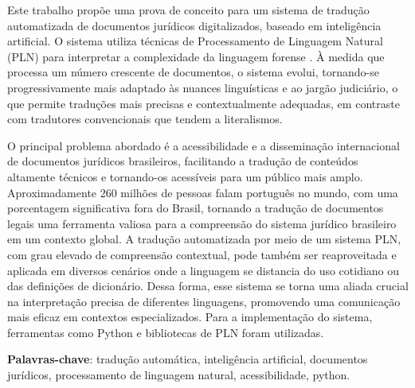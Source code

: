 
\setlength{\absparsep}{18pt} %
\begin{resumo}


Este trabalho propõe uma prova de conceito para um sistema de tradução automatizada de documentos jurídicos digitalizados, baseado em inteligência artificial. O sistema utiliza técnicas de Processamento de Linguagem Natural (PLN) para interpretar a complexidade da linguagem forense . À medida que processa um número crescente de documentos, o sistema evolui, tornando-se progressivamente mais adaptado às nuances linguísticas e ao jargão judiciário, o que permite traduções mais precisas e contextualmente adequadas, em contraste com tradutores convencionais que tendem a literalismos.


O principal problema abordado é a acessibilidade e a disseminação internacional de documentos jurídicos brasileiros, facilitando a tradução de conteúdos altamente técnicos e tornando-os acessíveis para um público mais amplo. Aproximadamente 260 milhões de pessoas falam português no mundo, com uma porcentagem significativa fora do Brasil, tornando a tradução de documentos legais uma ferramenta valiosa para a compreensão do sistema jurídico brasileiro em um contexto global.
A tradução automatizada por meio de um sistema PLN, com grau elevado de compreensão contextual, pode também ser reaproveitada e aplicada em diversos cenários onde a linguagem se distancia do uso cotidiano ou das definições de dicionário. Dessa forma, esse sistema se torna uma aliada crucial na interpretação precisa de diferentes linguagens, promovendo uma comunicação mais eficaz em contextos especializados.
Para a implementação do sistema, ferramentas como Python e bibliotecas de PLN foram utilizadas.


\textbf{Palavras-chave}: tradução automática, inteligência artificial, documentos jurídicos, processamento de linguagem natural, acessibilidade, python. \end{resumo}






